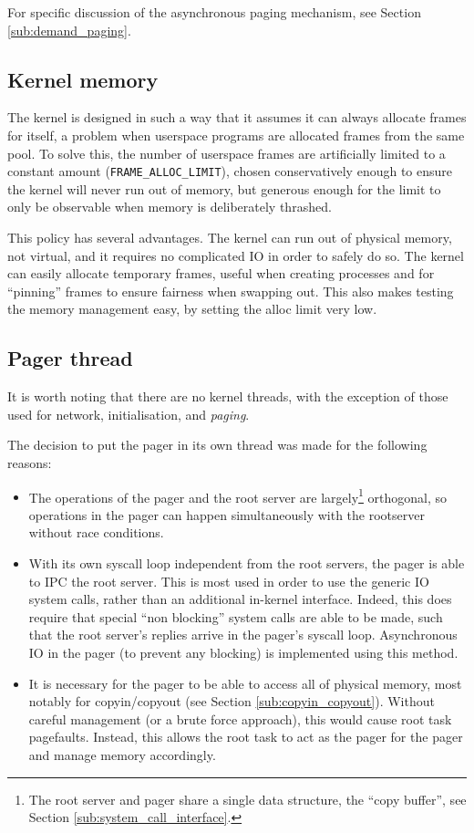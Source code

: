 \documentclass[12pt,english]{article}
\begin{document}
For specific discussion of the asynchronous paging mechanism, see Section \ref{sub:demand_paging}.

\subsection{Kernel memory}

The kernel is designed in such a way that it assumes it can always allocate frames for itself, a problem when userspace programs are allocated frames from the same pool.  To solve this, the number of userspace frames are artificially limited to a constant amount (\texttt{FRAME\_ALLOC\_LIMIT}), chosen conservatively enough to ensure the kernel will never run out of memory, but generous enough for the limit to only be observable when memory is deliberately thrashed.

This policy has several advantages.  The kernel can run out of physical memory, not virtual, and it requires no complicated IO in order to safely do so.  The kernel can easily allocate temporary frames, useful when creating processes and for ``pinning'' frames to ensure fairness when swapping out.  This also makes testing the memory management easy, by setting the alloc limit very low.

\subsection{Pager thread}

It is worth noting that there are no kernel threads, with the exception of those used for network, initialisation, and \emph{paging}.

The decision to put the pager in its own thread was made for the following reasons:
\begin{itemize}
\item The operations of the pager and the root server are largely\footnote{The root server and pager share a single data structure, the ``copy buffer'', see Section \ref{sub:system_call_interface}.} orthogonal, so operations in the pager can happen simultaneously with the rootserver without race conditions.
\item With its own syscall loop independent from the root servers, the pager is able to IPC the root server.  This is most used in order to use the generic IO system calls, rather than an additional in-kernel interface.  Indeed, this does require that special ``non blocking'' system calls are able to be made, such that the root server's replies arrive in the pager's syscall loop.  Asynchronous IO in the pager (to prevent any blocking) is implemented using this method.
\item It is necessary for the pager to be able to access all of physical memory, most notably for copyin/copyout (see Section \ref{sub:copyin_copyout}).  Without careful management (or a brute force approach), this would cause root task pagefaults.  Instead, this allows the root task to act as the pager for the pager and manage memory accordingly.
\end{itemize}
\end{document}
